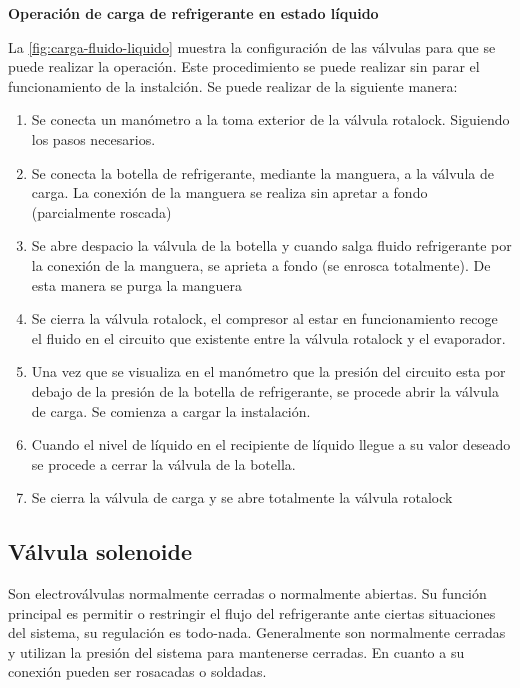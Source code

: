 \textbf{Operaci\'on de carga de refrigerante en estado l\'iquido}

La \autoref{fig:carga-fluido-liquido} muestra la configuraci\'on de las v\'alvulas para que se puede realizar la operaci\'on. Este procedimiento se puede realizar sin parar el funcionamiento de la instalci\'on. Se puede realizar de la siguiente manera:

\begin{enumerate}[1.]
    \item Se conecta un man\'ometro a la toma exterior de la v\'alvula rotalock. Siguiendo los pasos necesarios.
    \item Se conecta la botella de refrigerante, mediante la manguera, a la v\'alvula de carga. La conexi\'on de la manguera se realiza sin apretar a fondo (parcialmente roscada)
    \item Se abre despacio la v\'alvula de la botella y cuando salga fluido refrigerante por la conexi\'on de la manguera, se aprieta a fondo (se enrosca totalmente). De esta manera se purga la manguera
    \item Se cierra la v\'alvula rotalock, el compresor al estar en funcionamiento recoge el fluido en el circuito que existente entre la v\'alvula rotalock y el evaporador.
    \item Una vez que se visualiza en el man\'ometro que la presi\'on del circuito esta por debajo de la presi\'on de la botella de refrigerante, se procede abrir la v\'alvula de carga. Se comienza a cargar la instalaci\'on.
    \item Cuando el nivel de l\'iquido en el recipiente de l\'iquido llegue a su valor deseado se procede a cerrar la v\'alvula de la botella.
    \item Se cierra la v\'alvula de carga y se abre totalmente la v\'alvula rotalock
\end{enumerate}

\subsection{V\'alvula solenoide}

Son electrov\'alvulas normalmente cerradas o normalmente abiertas. Su funci\'on principal es permitir o restringir el flujo del refrigerante ante ciertas situaciones del sistema, su regulaci\'on es todo-nada. Generalmente son normalmente cerradas y utilizan la presi\'on del sistema para mantenerse cerradas. En cuanto a su conexi\'on pueden ser rosacadas o soldadas.

